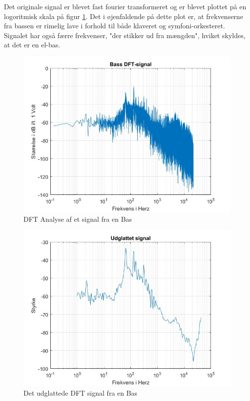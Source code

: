 Det originale signal er blevet fast fourier transformeret og er blevet plottet på en logoritmisk skala på figur \ref{fig:Bas DFT}. Det i øjenfaldende på dette plot er, at frekvenserne fra bassen er rimelig lave i forhold til både klaveret og symfoni-orkesteret. Signalet har også færre frekvenser, "der stikker ud fra mængden", hviket skyldes, at det er en el-bas.

\begin{figure}[H]
	\centering
	\includegraphics[width=120mm]{figures/Bass/DFT.jpg}
	\caption{DFT Analyse af et signal fra en Bas}
	\label{fig:Bas DFT}
\end{figure}

\begin{figure}[H]
	\centering
	\includegraphics[width=120mm]{figures/Bass/udglattet.jpg}
	\caption{Det udglattede DFT signal fra en Bas}
	\label{fig:Bas udglattet}
\end{figure}



